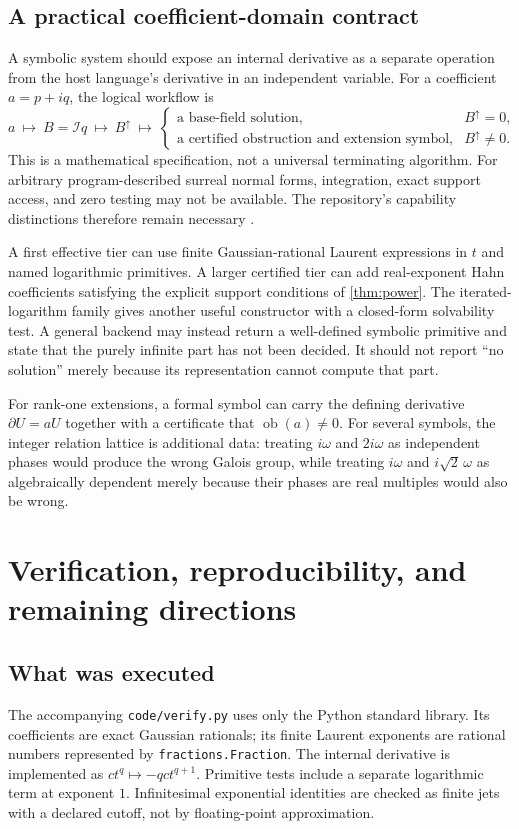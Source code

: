 \documentclass[11pt,a4paper]{article}
\numberwithin{equation}{section}
\theoremstyle{definition}
\theoremstyle{remark}
\newcommand{\D}{\partial}
\newcommand{\I}{\mathcal I}
\newcommand{\ob}{\operatorname{ob}}
\newcommand{\up}[1]{#1^{\uparrow}}
\begin{document}
\subsection{A practical coefficient-domain contract}
A symbolic system should expose an internal derivative as a separate
operation from the host language's derivative in an independent variable.
For a coefficient $a=p+iq$, the logical workflow is
\begin{equation}\label{eq:workflow}
 a\ \longmapsto\ B=\I q\ \longmapsto\ \up B
 \ \longmapsto\
 \begin{cases}
  \text{a base-field solution},&\up B=0,\\
  \text{a certified obstruction and extension symbol},&\up B\ne0.
 \end{cases}
\end{equation}
This is a mathematical specification, not a universal terminating
algorithm. For arbitrary program-described surreal normal forms,
integration, exact support access, and zero testing may not be available.
The repository's capability distinctions therefore remain necessary
\cite{RepoCAS}.

A first effective tier can use finite Gaussian-rational Laurent expressions
in $t$ and named logarithmic primitives. A larger certified tier can add
real-exponent Hahn coefficients satisfying the explicit support conditions
of \cref{thm:power}. The iterated-logarithm family gives another useful
constructor with a closed-form solvability test. A general backend may
instead return a well-defined symbolic primitive and state that the
purely infinite part has not been decided. It should not report
``no solution'' merely because its representation cannot compute that part.

For rank-one extensions, a formal symbol can carry the defining derivative
$\D U=aU$ together with a certificate that $\ob(a)\ne0$. For several
symbols, the integer relation lattice is additional data: treating
$i\omega$ and $2i\omega$ as independent phases would produce the wrong
Galois group, while treating $i\omega$ and $i\sqrt2\,\omega$ as
algebraically dependent merely because their phases are real multiples
would also be wrong.

\section{Verification, reproducibility, and remaining directions}\label{sec:verification}

\subsection{What was executed}
The accompanying \texttt{code/verify.py} uses only the Python standard
library. Its coefficients are exact Gaussian rationals; its finite
Laurent exponents are rational numbers represented by
\texttt{fractions.Fraction}. The internal derivative is implemented as
$c t^q\mapsto-qc t^{q+1}$. Primitive tests include a separate logarithmic
term at exponent $1$. Infinitesimal exponential identities are checked
as finite jets with a declared cutoff, not by floating-point approximation.
\end{document}

